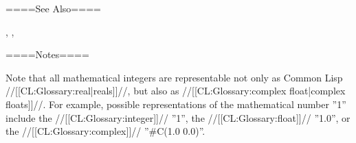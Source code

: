 
====See Also====

{\figref\SyntaxForNumericTokens}, {\secref\NumsFromTokens}, {\secref\PrintingFloats}

====Notes====

Note that all mathematical integers are representable not only as Common Lisp //[[CL:Glossary:real|reals]]//, but also as //[[CL:Glossary:complex float|complex floats]]//. For example, possible representations of the mathematical number ''1'' include the //[[CL:Glossary:integer]]// ''1'', the //[[CL:Glossary:float]]// ''1.0'', or the //[[CL:Glossary:complex]]// ''#C(1.0 0.0)''.

